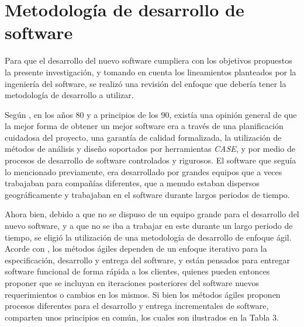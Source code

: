 	\section{Metodolog\'{i}a de desarrollo de software}
Para que el desarrollo del nuevo software cumpliera con los objetivos propuestos la presente investigaci\'{o}n, y tomando en cuenta los lineamientos planteados por la ingenier\'{i}a del software, se realiz\'{o} una revisi\'{o}n del enfoque que deber\'{i}a tener la metodolog\'{i}a de desarrollo a utilizar.

Seg\'{u}n \cite{Sommerville}, en los a\~{n}os 80 y a principios de los 90, exist\'{i}a una opini\'{o}n general de que la mejor forma de obtener un mejor software era a trav\'{e}s de una planificaci\'{o}n cuidadosa del proyecto, una garant\'{i}a de calidad formalizada, la utilizaci\'{o}n de m\'{e}todos de an\'{a}lisis y dise\~{n}o soportados por herramientas \textit{CASE}, y por medio de procesos de desarrollo de software controlados y rigurosos. El software que segu\'{i}a lo mencionado previamente, era desarrollado por grandes equipos que a veces trabajaban para compa\~{n}\'{i}as diferentes, que a menudo estaban dispersos geogr\'{a}ficamente y trabajaban en el software durante largos periodos de tiempo.

Ahora bien, debido a que no se dispuso de un equipo grande para el desarrollo del nuevo software, y a que no se iba a trabajar en este durante un largo periodo de tiempo, se eligi\'{o} la utilizaci\'{o}n de una metodolog\'{i}a de desarrollo de enfoque \'{a}gil. Acorde con \cite{Sommerville}, los m\'{e}todos \'{a}giles dependen de un enfoque iterativo para la especificaci\'{o}n, desarrollo y entrega del software, y est\'{a}n pensados para entregar software funcional de forma r\'{a}pida a los clientes, quienes pueden entonces proponer que se incluyan en iteraciones posteriores del software nuevos requerimientos o cambios en los mismos. Si bien los m\'{e}todos \'{a}giles proponen procesos diferentes para el desarrollo y entrega incrementales de software, comparten unos principios en com\'{u}n, los cuales son ilustrados en la Tabla 3.

